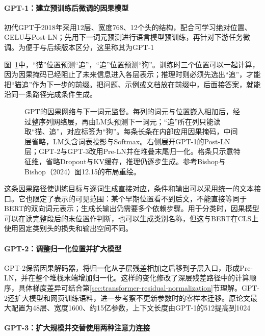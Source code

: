 \paragraph{GPT-1：建立预训练后微调的因果模型}

初代GPT于2018年采用12层、宽度768、12个头的结构，配合可学习绝对位置、GELU与Post-LN；先用下一词元预测进行语言模型预训练，再针对下游任务微调。为便于与后续版本区分，这里称其为GPT-1

图~\ref{fig:transformer-architecture-gpt}中，“猫”位置预测“追”，“追”位置预测“狗”。训练时三个位置可以一起计算，因为因果掩码已经阻止了未来信息进入各层表示；推理时则必须先选出“追”，才能把“猫追”作为下一步的前缀。把问题、示例或文档放在前缀中，后面接答案，就能沿同一条路径完成条件生成。

\begin{figure}[p]
  \centering
  
  \caption{GPT的因果网络与下一词元监督。每列的词元与位置嵌入相加后，经过整序列网络层，再由LM头预测下一词元；“追”所在列只能读取“猫、追”，对应标签为“狗”。每条长条在内部应用因果掩码，中间层省略，LM头含词表投影与Softmax。右侧展开GPT-1的Post-LN层；GPT-2与GPT-3改用Pre-LN并在堆叠末尾归一化。格条只示意特征维，省略Dropout与KV缓存，推理仍逐步生成。参考Bishop与Bishop（2024）图12.15的布局重绘。}
  \label{fig:transformer-architecture-gpt}
\end{figure}
\FloatBarrier

这条因果路径使训练目标与逐词生成直接对应，条件和输出可以采用统一的文本接口。它也限定了表示的可见范围：某个早期位置看不到后文，不能直接等同于BERT的双向词元表示；生成长输出仍需要多个依赖步骤。用于分类时，因果模型可以在读完整段后的末位置作判断，也可以生成类别名称，但这与BERT在CLS上使用固定类别头的损失和输出空间不同。

\paragraph{GPT-2：调整归一化位置并扩大模型}

GPT-2保留因果解码器，将归一化从子层残差相加之后移到子层入口，形成Pre-LN，并在整个堆栈末端增加归一化。这样的变化修改了深层残差路径中的计算顺序，具体梯度差异可结合第\ref{sec:transformer-residual-normalization}节理解。GPT-2还扩大模型和网页训练语料，进一步考察不更新参数时的零样本迁移。原论文最大配置为48层、宽度1600、约15亿参数，上下文长度由GPT-1的512提高到1024

\Needspace{190mm}
\paragraph{GPT-3：扩大规模并交替使用两种注意力连接}

